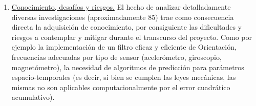 \begin{enumerate}
    \item \underline{Conocimiento, desafíos y riesgos.} El hecho de analizar detalladamente diversas investigaciones (aproximadamente 85) trae como consecuencia directa la adquisición de conocimiento, por consiguiente las dificultades y riesgos a contemplar y mitigar durante el transcurso del proyecto. Como por ejemplo la implementación de un filtro eficaz y eficiente de Orientación, frecuencias adecuadas por tipo de sensor (acelerómetro, giroscopio, magnetómetro), la necesidad de algoritmos de predicción para parámetros espacio-temporales (es decir, si bien se cumplen las leyes mecánicas, las mismas no son aplicables computacionalmente por el error cuadrático acumulativo). 
\end{enumerate}